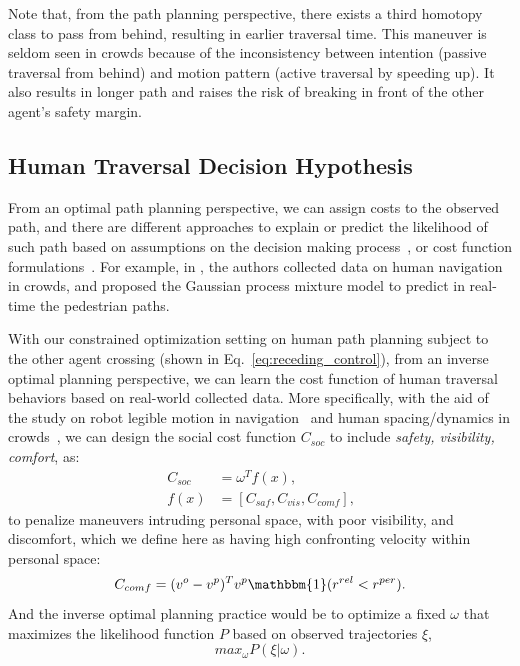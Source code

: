 \documentclass[conference]{IEEEtran}
\begin{document}
Note that, from the path planning perspective, there exists a third homotopy 
class to pass from behind,
resulting in earlier traversal time. This maneuver is seldom seen in 
crowds because of the inconsistency between intention (passive traversal from 
behind) and motion pattern (active traversal by speeding up). It also results in 
longer path and raises the risk of breaking in front of the other agent's 
safety margin. 
\vspace{-.2em}
\subsection{Human Traversal Decision Hypothesis} 
From an optimal path planning perspective, we can assign costs to 
the observed path, and there are different approaches to explain or predict 
the likelihood of such path based on assumptions on the decision making 
process~\cite{ratliff2006maximum, ziebart2008maximum}, or cost function 
formulations~\cite{kruse2012legible}. For example, in 
\cite{trautman2010unfreezing}, the authors collected data on human 
navigation in crowds, and proposed the Gaussian 
process mixture model to predict in real-time the pedestrian paths. 

With our constrained optimization setting on human path planning subject to the other agent 
crossing (shown in Eq.~\ref{eq:receding_control}), from an inverse optimal 
planning perspective, we can learn the cost function of human traversal 
behaviors based on real-world collected data. More specifically, with the aid 
of the study on robot legible motion in 
navigation~\cite{kruse2012legible,lichtenthaler2012influence} and human 
spacing/dynamics in crowds~\cite{helbing1995social,hall1966hidden}, we can 
design the social cost function $C_{soc}$ to include \textit{safety, 
visibility, comfort}, as:
\begin{equation}~\label{eq:social_cost}
  \begin{aligned}
    C_{soc} &= \omega^T f(x), \\
    f(x) &= [C_{saf}, C_{vis}, C_{comf}],
  \end{aligned}
\end{equation}
to penalize maneuvers intruding personal space, with poor visibility, and 
discomfort, which we define here as having high confronting velocity within personal space:
\begin{equation}
  C_{comf} = (v^o-v^p)^T v^p \mathbbm{1}(r^{rel}<r^{per}).
\end{equation}
And the inverse optimal planning practice would be to optimize a fixed 
$\omega$ that maximizes the likelihood function $P$ based on observed 
trajectories $\xi$,
\begin{equation}
  max_{\omega} P(\xi|\omega).
\end{equation}
\end{document}
